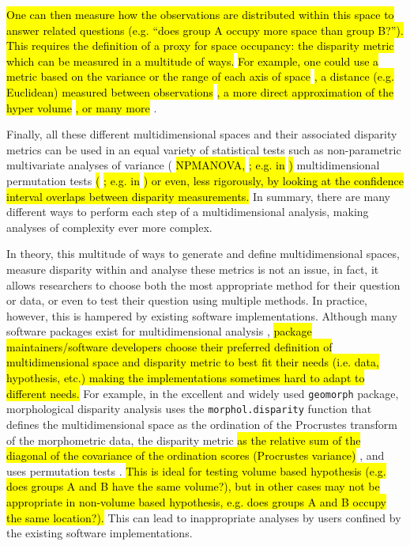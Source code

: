 \documentclass[12pt,letterpaper]{article}
\begin{document}
\hl{One can then measure how the observations are distributed within this space to answer related questions (e.g. ``does group A occupy more space than group B?'').
This requires the definition of a proxy for space occupancy: the disparity metric}
\citep[or index;][]{Hopkins2017}
\hl{which can be measured in a multitude of ways.}
\hl{For example, one could use a metric based on the variance or the range of each axis of space}
\citep{Wills2001, Ciampaglio2001}
\hl{, a distance (e.g. Euclidean) measured between observations}
\citep{foote1993contributions,Foote29111996}
\hl{, a more direct approximation of the hyper volume }
\citep{cornwell2006trait,DonohueDim}
\hl{, or many more }
\citep[e.g.][]{navarro2003MDA}.

Finally, all these different multidimensional spaces and their associated disparity metrics can be used in an equal variety of statistical tests such as non-parametric multivariate analyses of variance (
\hl{NPMANOVA, }
\citealt{NPMANOVA}
\hl{; e.g. in }
\citealt{Brusatte12092008}
\hl{)}
multidimensional permutation tests
\hl{(}
\citealt{ManlyPermutations}
\hl{; e.g. in }
\citealt{diaz2016global}
\hl{) or even, less rigorously, by looking at the confidence interval overlaps between disparity measurements.}
In summary, there are many different ways to perform each step of a multidimensional analysis, making analyses of complexity ever more complex.

In theory, this multitude of ways to generate and define multidimensional spaces, measure disparity within and analyse these metrics is not an issue, in fact, it allows researchers to choose both the most appropriate method for their question or data, or even to test their question using multiple methods.
In practice, however, this is hampered by existing software implementations.
Although many software packages exist for multidimensional analysis \citep[e.g.][]{navarro2003MDA,bouxin2005ginkgo,de2007ginkgo,oksanen2007vegan,geiger2008,adams2013geomorph,Claddis,adams2017geometric},
\hl{package maintainers/software developers choose their preferred definition of multidimensional space and disparity metric to best fit their needs (i.e. data, hypothesis, etc.) making the implementations sometimes hard to adapt to different needs.}
For example, in the excellent and widely used \texttt{geomorph} package, morphological disparity analysis uses the \texttt{morphol.disparity} function that defines the multidimensional space as the ordination of the Procrustes transform of the morphometric data, the disparity metric
\hl{as the relative sum of the diagonal of the covariance of the ordination scores (Procrustes variance)}
, and uses permutation tests \citep{zelditch2012geometric,adams2013geomorph,adams2017geometric}.
\hl{This is ideal for testing volume based hypothesis (e.g. does groups A and B have the same volume?), but in other cases may not be appropriate in non-volume based hypothesis, e.g. does groups A and B occupy the same location?).}
This can lead to inappropriate analyses by users confined by the existing software implementations. %
\end{document}

